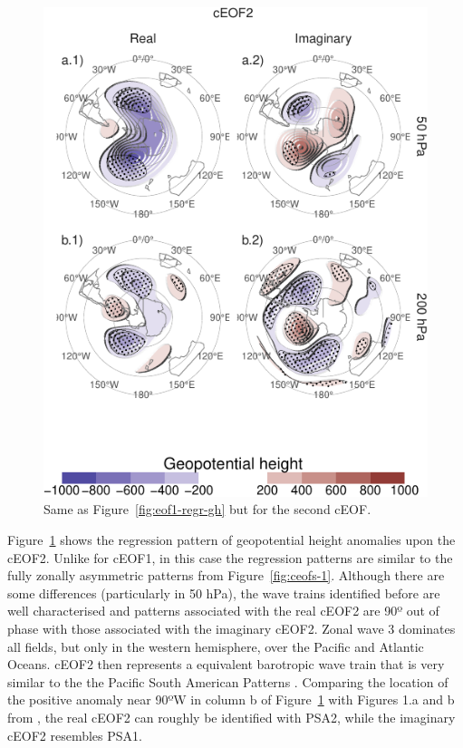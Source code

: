 \documentclass[smallextended]{svjour3}       %
\begin{document}
\begin{figure}
\centering
\includegraphics{../figures/eof2-regr-gh-1.pdf}
\caption{\label{fig:eof2-regr-gh}Same as Figure~\ref{fig:eof1-regr-gh} but for the second cEOF.}
\end{figure}

Figure~\ref{fig:eof2-regr-gh} shows the regression pattern of geopotential height anomalies upon the cEOF2. Unlike for cEOF1, in this case the regression patterns are similar to the fully zonally asymmetric patterns from Figure~\ref{fig:ceofs-1}. Although there are some differences (particularly in 50 hPa), the wave trains identified before are well characterised and patterns associated with the real cEOF2 are 90º out of phase with those associated with the imaginary cEOF2. Zonal wave 3 dominates all fields, but only in the western hemisphere, over the Pacific and Atlantic Oceans. cEOF2 then represents a equivalent barotropic wave train that is very similar to the the Pacific South American Patterns \citep{mo2001}.
Comparing the location of the positive anomaly near 90ºW in column b of Figure~\ref{fig:eof2-regr-gh} with Figures 1.a and b from \citet{mo2001}, the real cEOF2 can roughly be identified with PSA2, while the imaginary cEOF2 resembles PSA1.
\end{document}

